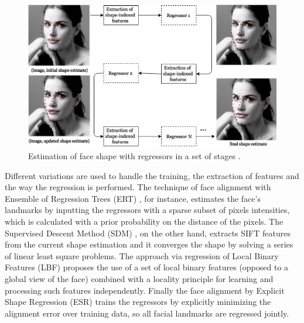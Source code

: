 \begin{figure}[h]
    \centering
    \includegraphics[width=1.0\linewidth]{Content/figures/cascade-explanation.png}
    \caption{Estimation of face shape with regressors in a set of stages \parencite{maris2015}.}
    \label{fig:regressor-steps}
\end{figure}

Different variations are used to handle the training, the extraction of features and the way the regression is performed. The technique of face alignment with Ensemble of Regression Trees (ERT) \parencite{kazemi2014one}, for instance, estimates the face's landmarks by inputting the regressors with a sparse subset of pixels intensities, which is calculated with a prior probability on the distance of the pixels. The Supervised Descent Method (SDM) \parencite{xiong2013supervised}, on the other hand, extracts SIFT features from the current shape estimation and it converges the shape by solving a series of linear least square problems. The approach via regression of Local Binary Features (LBF) \parencite{ren2014face} proposes the use of a set of local binary features (opposed to a global view of the face) combined with a locality principle for learning and processing such features independently. Finally the face alignment by Explicit Shape Regression (ESR) \parencite{cao2014face} trains the regressors by explicitly minimizing the alignment error over training data, so all facial landmarks are regressed jointly.

